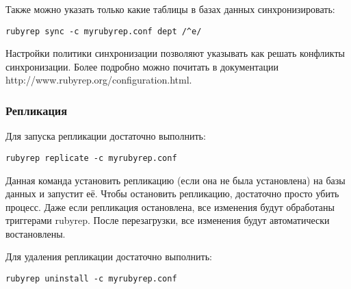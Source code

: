 Также можно указать только какие таблицы в базах данных синхронизировать:
\begin{verbatim}
rubyrep sync -c myrubyrep.conf dept /^e/
\end{verbatim}

Настройки политики синхронизации позволяют указывать как решать конфликты синхронизации. 
Более подробно можно почитать в документации http://www.rubyrep.org/configuration.html. 

\subsubsection{Репликация}
Для запуска репликации достаточно выполнить:
\begin{verbatim}
rubyrep replicate -c myrubyrep.conf
\end{verbatim}

Данная команда установить репликацию (если она не была установлена) на базы данных и запустит её.
Чтобы остановить репликацию, достаточно просто убить процесс. Даже если репликация остановлена, 
все изменения будут обработаны триггерами rubyrep. После перезагрузки, все изменения 
будут автоматически востановлены.

Для удаления репликации достаточно выполнить:
\begin{verbatim}
rubyrep uninstall -c myrubyrep.conf
\end{verbatim}